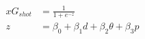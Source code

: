 \begin{equation}
\begin{aligned}
xG_{shot} &= \frac{1}{1 + e^{-z}} \\
z &= \beta_0 + \beta_1 d + \beta_2 \theta + \beta_3 p
\end{aligned}
\end{equation}